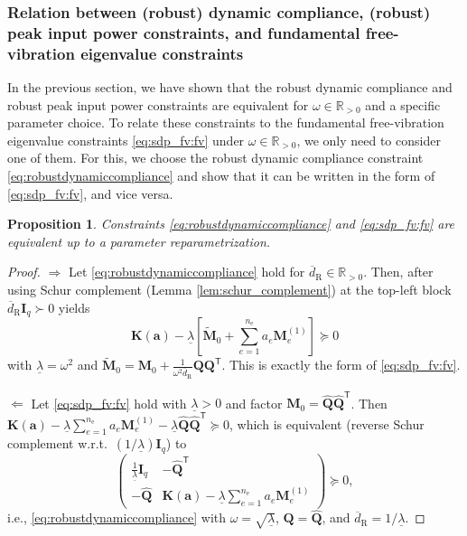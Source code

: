 \documentclass[preprint,3p]{elsarticle}
\newtheorem{proposition}{Proposition}
\newcommand{\T}{^{\mathsf T}}
\newcommand{\nel}{n_\mathrm{e}}
\newcommand{\R}{\mathrm{R}}
\numberwithin{equation}{section}
\begin{document}
\subsubsection{Relation between (robust) dynamic compliance, (robust) peak input power constraints, and fundamental free-vibration eigenvalue constraints}

In the previous section, we have shown that the robust dynamic compliance and robust peak input power constraints are equivalent for $\omega \in \mathbb{R}_{>0}$ and a specific parameter choice. To relate these constraints to the fundamental free-vibration eigenvalue constraints \eqref{eq:sdp_fv:fv} under $\omega\in \mathbb{R}_{>0}$, we only need to consider one of them. For this, we choose the robust dynamic compliance constraint \eqref{eq:robustdynamiccompliance} and show that it can be written in the form of \eqref{eq:sdp_fv:fv}, and vice versa.

\begin{proposition}
  Constraints \eqref{eq:robustdynamiccompliance} and \eqref{eq:sdp_fv:fv} are equivalent up to a parameter reparametrization.
\end{proposition}
\begin{proof}
  $\Rightarrow$ Let \eqref{eq:robustdynamiccompliance} hold for $\overline{d}_\R \in \mathbb{R}_{>0}$. Then, after using Schur complement (Lemma \ref{lem:schur_complement}) at the top-left block $\overline d_\R \mathbf{I}_q\succ0$ yields
  \begin{equation}
    \mathbf{K}(\mathbf{a}) - \underline{\lambda} \left[\tilde{\mathbf{M}}_0 +  \sum_{e=1}^{\nel} a_e \mathbf{M}_e ^{(1)} \right]  \succeq 0
  \end{equation}
  with $\underline{\lambda} = \omega^2$ and $\tilde{\mathbf{M}}_0 = \mathbf{M}_0 + \frac{1}{\omega^2 \overline{d}_\R} \mathbf{Q} \mathbf{Q}\T$. This is exactly the form of \eqref{eq:sdp_fv:fv}.

  $\Leftarrow$ Let \eqref{eq:sdp_fv:fv} hold with $\underline{\lambda}>0$ and factor $\mathbf{M}_0=\hat{\mathbf{Q}}\hat{\mathbf{Q}}\T$. Then $\mathbf K(\mathbf a)-\underline\lambda\sum_{e=1}^{\nel} a_e\mathbf M^{(1)}_e-\underline\lambda\hat{\mathbf{Q}}\hat{\mathbf{Q}}\T\succeq0$,
  which is equivalent (reverse Schur complement w.r.t.\ $(1/\underline\lambda)\mathbf{I}_q$) to
  \begin{equation}
    \begin{pmatrix}
      \frac{1}{\underline{\lambda}}\mathbf{I}_q & -\hat{\mathbf{Q}}\T\\
      -\hat{\mathbf{Q}} & \mathbf{K}(\mathbf{a})-\underline{\lambda}\sum_{e=1}^{\nel} a_e \mathbf{M}^{(1)}_e
    \end{pmatrix} \succeq 0,
  \end{equation}
  i.e., \eqref{eq:robustdynamiccompliance} with $\omega=\sqrt{\underline\lambda}$, $\mathbf{Q} = \hat{\mathbf{Q}}$, and $\overline d_\R=1/\underline\lambda$.  
\end{proof}
\end{document}
